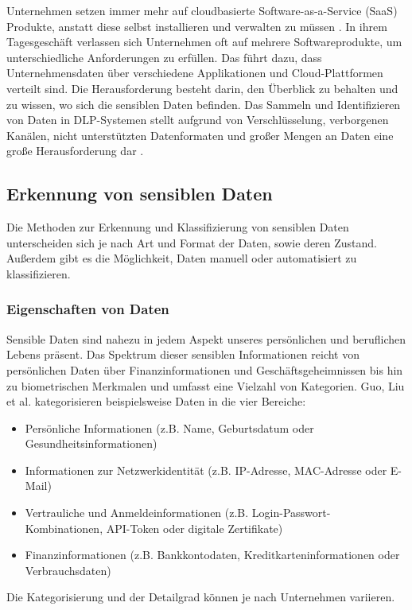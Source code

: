 Unternehmen setzen immer mehr auf cloudbasierte Software-as-a-Service (SaaS) Produkte, anstatt diese selbst installieren und verwalten zu müssen \cite{Gartner.2023}. In ihrem Tagesgeschäft verlassen sich Unternehmen oft auf mehrere Softwareprodukte, um unterschiedliche Anforderungen zu erfüllen. Das führt dazu, dass Unternehmensdaten über verschiedene Applikationen und Cloud-Plattformen verteilt sind. Die Herausforderung besteht darin, den Überblick zu behalten und zu wissen, wo sich die sensiblen Daten befinden. Das Sammeln und Identifizieren von Daten in DLP-Systemen stellt aufgrund von Verschlüsselung, verborgenen Kanälen, nicht unterstützten Datenformaten und großer Mengen an Daten eine große Herausforderung dar \cite{Hauer.2015}.

\subsection{Erkennung von sensiblen Daten}
Die Methoden zur Erkennung und Klassifizierung von sensiblen Daten unterscheiden sich je nach Art und Format der Daten, sowie deren Zustand. Außerdem gibt es die Möglichkeit, Daten manuell oder automatisiert zu klassifizieren.

\subsubsection{Eigenschaften von Daten}
Sensible Daten sind nahezu in jedem Aspekt unseres persönlichen und beruflichen Lebens präsent. Das Spektrum dieser sensiblen Informationen reicht von persönlichen Daten über Finanzinformationen und Geschäftsgeheimnissen bis hin zu biometrischen Merkmalen und umfasst eine Vielzahl von Kategorien. Guo, Liu et al. \cite{Guo.2021} kategorisieren beispielsweise Daten in die vier Bereiche:
\begin{itemize}
    \item Persönliche Informationen (z.B. Name, Geburtsdatum oder Gesundheitsinformationen)
    \item Informationen zur Netzwerkidentität (z.B. IP-Adresse, MAC-Adresse oder E-Mail)
    \item Vertrauliche und Anmeldeinformationen (z.B. Login-Passwort-Kombinationen, API-Token oder digitale Zertifikate)
    \item Finanzinformationen (z.B. Bankkontodaten, Kreditkarteninformationen oder Verbrauchsdaten)
\end{itemize}
Die Kategorisierung und der Detailgrad können je nach Unternehmen variieren.

